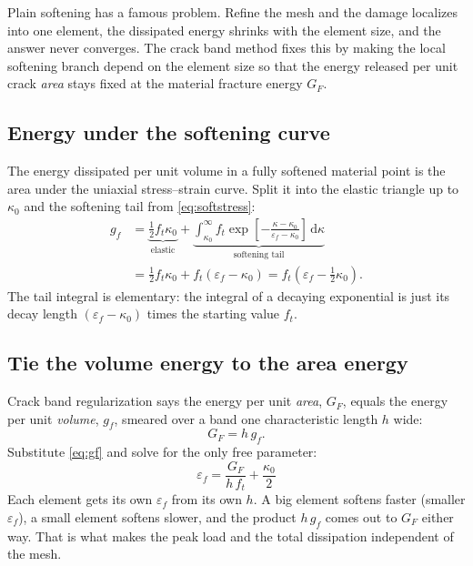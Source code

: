 \documentclass[11pt]{article}
\newcommand{\dd}{\,\mathrm{d}}
\begin{document}

Plain softening has a famous problem. Refine the mesh and the damage localizes into one
element, the dissipated energy shrinks with the element size, and the answer never
converges. The crack band method fixes this by making the local softening branch depend on
the element size so that the energy released per unit crack \emph{area} stays fixed at the
material fracture energy $G_F$.

\subsection{Energy under the softening curve}

The energy dissipated per unit volume in a fully softened material point is the area under
the uniaxial stress--strain curve. Split it into the elastic triangle up to $\kappa_0$ and
the softening tail from \eqref{eq:softstress}:
%
\begin{align}
g_f &= \underbrace{\tfrac{1}{2} f_t \kappa_0}_{\text{elastic}}
     + \underbrace{\int_{\kappa_0}^{\infty} f_t
       \exp\!\left[-\frac{\kappa-\kappa_0}{\varepsilon_f-\kappa_0}\right]\dd\kappa}_{\text{softening tail}}
     \\[2pt]
    &= \tfrac{1}{2} f_t \kappa_0 + f_t(\varepsilon_f-\kappa_0)
     = f_t\!\left(\varepsilon_f - \tfrac{1}{2}\kappa_0\right).
\label{eq:gf}
\end{align}
%
The tail integral is elementary: the integral of a decaying exponential is just its decay
length $(\varepsilon_f-\kappa_0)$ times the starting value $f_t$.

\subsection{Tie the volume energy to the area energy}

Crack band regularization says the energy per unit \emph{area}, $G_F$, equals the energy
per unit \emph{volume}, $g_f$, smeared over a band one characteristic length $h$ wide:
%
\begin{equation}
G_F = h\,g_f .
\end{equation}
%
Substitute \eqref{eq:gf} and solve for the only free parameter:
%
\begin{equation}
\boxed{\;\varepsilon_f = \frac{G_F}{h\,f_t} + \frac{\kappa_0}{2}\;}
\label{eq:epsf}
\end{equation}
%
Each element gets its own $\varepsilon_f$ from its own $h$. A big element softens faster
(smaller $\varepsilon_f$), a small element softens slower, and the product $h\,g_f$ comes
out to $G_F$ either way. That is what makes the peak load and the total dissipation
independent of the mesh.
\end{document}
